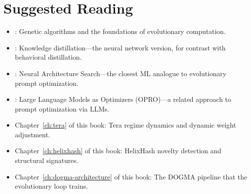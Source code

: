 \section*{Suggested Reading}
\begin{itemize}[leftmargin=1.5em]
  \item \citet{holland1992}: Genetic algorithms and the foundations of evolutionary computation.
  \item \citet{hinton2015}: Knowledge distillation---the neural network version, for contrast with behavioral distillation.
  \item \citet{zoph2017}: Neural Architecture Search---the closest ML analogue to evolutionary prompt optimization.
  \item \citet{zhou2023}: Large Language Models as Optimizers (OPRO)---a related approach to prompt optimization via LLMs.
  \item Chapter~\ref{ch:tera} of this book: Tera regime dynamics and dynamic weight adjustment.
  \item Chapter~\ref{ch:helixhash} of this book: HelixHash novelty detection and structural signatures.
  \item Chapter~\ref{ch:dogma-architecture} of this book: The DOGMA pipeline that the evolutionary loop trains.
\end{itemize}
